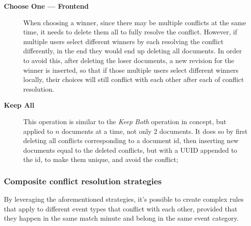\begin{description} \label{list:conflict-resolution-strategies-frontend}
    \item[\textbf{Choose One --- Frontend}] When choosing a winner, since there may be multiple conflicts at the same time, it needs to delete them all to fully resolve the conflict. However, if multiple users select different winners by each resolving the conflict differently, in the end they would end up deleting all documents. In order to avoid this, after deleting the loser documents, a new revision for the winner is inserted, so that if those multiple users select different winners locally, their choices will still conflict with each other after each  of conflict resolution. 
    \item[\textbf{Keep All}] This operation is similar to the \textit{Keep Both} operation in concept, but applied to $n$ documents at a time, not only 2 documents. It does so by first deleting all conflicts corresponding to a document id, then inserting new documents equal to the deleted conflicts, but with a UUID appended to the id, to make them unique, and avoid the conflict;
\end{description}

\subsubsection{Composite conflict resolution strategies}

By leveraging the aforementioned strategies, it's possible to create complex rules that apply to different event types that conflict with each other, provided that they happen in the same match minute and belong in the same event category.

